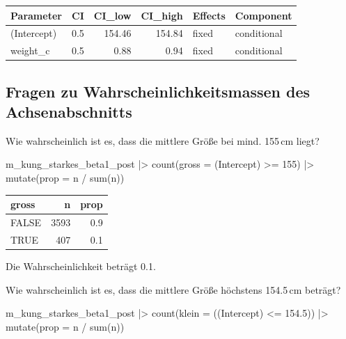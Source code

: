 \documentclass[
  ngerman,
  letterpaper,
  twoside,
  open=any]{scrbook}
\newenvironment{Shaded}{\begin{snugshade}}{\end{snugshade}}
\newcommand{\AttributeTok}[1]{\textcolor[rgb]{0.40,0.45,0.13}{#1}}
\newcommand{\DecValTok}[1]{\textcolor[rgb]{0.68,0.00,0.00}{#1}}
\newcommand{\FloatTok}[1]{\textcolor[rgb]{0.68,0.00,0.00}{#1}}
\newcommand{\FunctionTok}[1]{\textcolor[rgb]{0.28,0.35,0.67}{#1}}
\newcommand{\NormalTok}[1]{\textcolor[rgb]{0.00,0.23,0.31}{#1}}
\newcommand{\SpecialCharTok}[1]{\textcolor[rgb]{0.37,0.37,0.37}{#1}}
\newcommand{\StringTok}[1]{\textcolor[rgb]{0.13,0.47,0.30}{#1}}
\newcounter{none} %
\theoremstyle{definition}
\theoremstyle{plain}
\theoremstyle{definition}
\theoremstyle{definition}
\theoremstyle{definition}
\theoremstyle{definition}
\theoremstyle{remark}
\begin{document}
{\def\LTcaptype{none} %
\begin{longtable}[]{@{}lrrrll@{}}
\toprule\noalign{}
Parameter & CI & CI\_low & CI\_high & Effects & Component \\
\midrule\noalign{}
\endhead
\bottomrule\noalign{}
\endlastfoot
(Intercept) & 0.5 & 154.46 & 154.84 & fixed & conditional \\
weight\_c & 0.5 & 0.88 & 0.94 & fixed & conditional \\
\end{longtable}
}

\subsection{Fragen zu Wahrscheinlichkeitsmassen des
Achsenabschnitts}\label{fragen-zu-wahrscheinlichkeitsmassen-des-achsenabschnitts}

Wie wahrscheinlich ist es, dass die mittlere Größe bei mind. 155\,cm
liegt?

\begin{Shaded}
\begin{Highlighting}[]
\NormalTok{m\_kung\_starkes\_beta1\_post }\SpecialCharTok{|\textgreater{}} 
  \FunctionTok{count}\NormalTok{(}\AttributeTok{gross =} \StringTok{\textasciigrave{}}\AttributeTok{(Intercept)}\StringTok{\textasciigrave{}} \SpecialCharTok{\textgreater{}=} \DecValTok{155}\NormalTok{) }\SpecialCharTok{|\textgreater{}} 
  \FunctionTok{mutate}\NormalTok{(}\AttributeTok{prop =}\NormalTok{ n }\SpecialCharTok{/} \FunctionTok{sum}\NormalTok{(n))}
\end{Highlighting}
\end{Shaded}

{\def\LTcaptype{none} %
\begin{longtable}[]{@{}lrr@{}}
\toprule\noalign{}
gross & n & prop \\
\midrule\noalign{}
\endhead
\bottomrule\noalign{}
\endlastfoot
FALSE & 3593 & 0.9 \\
TRUE & 407 & 0.1 \\
\end{longtable}
}

Die Wahrscheinlichkeit beträgt 0.1.

Wie wahrscheinlich ist es, dass die mittlere Größe höchstens 154.5\,cm
beträgt?

\begin{Shaded}
\begin{Highlighting}[]
\NormalTok{m\_kung\_starkes\_beta1\_post }\SpecialCharTok{|\textgreater{}} 
  \FunctionTok{count}\NormalTok{(}\AttributeTok{klein =}\NormalTok{ (}\StringTok{\textasciigrave{}}\AttributeTok{(Intercept)}\StringTok{\textasciigrave{}} \SpecialCharTok{\textless{}=} \FloatTok{154.5}\NormalTok{)) }\SpecialCharTok{|\textgreater{}} 
  \FunctionTok{mutate}\NormalTok{(}\AttributeTok{prop =}\NormalTok{ n }\SpecialCharTok{/} \FunctionTok{sum}\NormalTok{(n))}
\end{Highlighting}
\end{Shaded}
\end{document}

